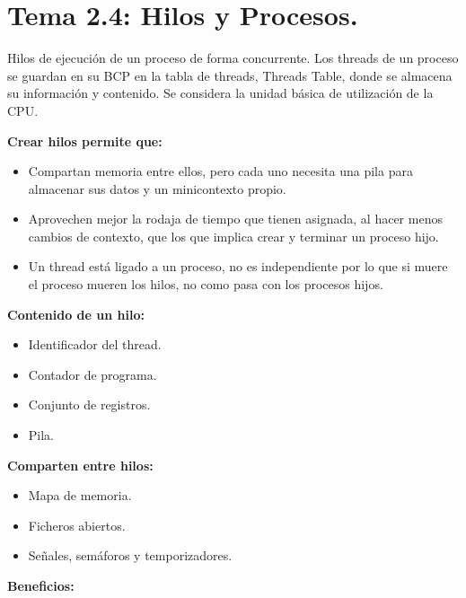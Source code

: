 \documentclass[12pt, twoside, openright]{report} %
\begin{document}
\section{Tema 2.4: Hilos y Procesos.}

Hilos de ejecución de un proceso de forma concurrente. Los threads de
  un proceso se guardan en su BCP en la tabla de threads, Threads Table,
  donde se almacena su información y contenido. Se considera la unidad
  básica de utilización de la CPU.
  
\textbf{Crear hilos permite que:}
  

  \begin{itemize}
  \item Compartan memoria entre ellos, pero cada uno necesita una pila para
    almacenar sus datos y un minicontexto propio.
    
  \item Aprovechen mejor la rodaja de tiempo que tienen asignada, al hacer
    menos cambios de contexto, que los que implica crear y terminar un
    proceso hijo.
    
  \item Un thread está ligado a un proceso, no es independiente por lo que
    si muere el proceso mueren los hilos, no como pasa con los procesos
    hijos.
    
  \end{itemize}
\textbf{Contenido de un hilo:}
  
\vspace{-0.5cm}

  \begin{itemize}
  \item Identificador del thread.
    
  \item Contador de programa.
    
  \item Conjunto de registros.
    
  \item Pila.
    
  \end{itemize}
\textbf{Comparten entre hilos:}
\vspace{-0.5cm}


  \begin{itemize}
  \item Mapa de memoria.
    
  \item Ficheros abiertos.
    
  \item Señales, semáforos y temporizadores.
    
  \end{itemize}
\textbf{Beneficios:}
  
\end{document}
